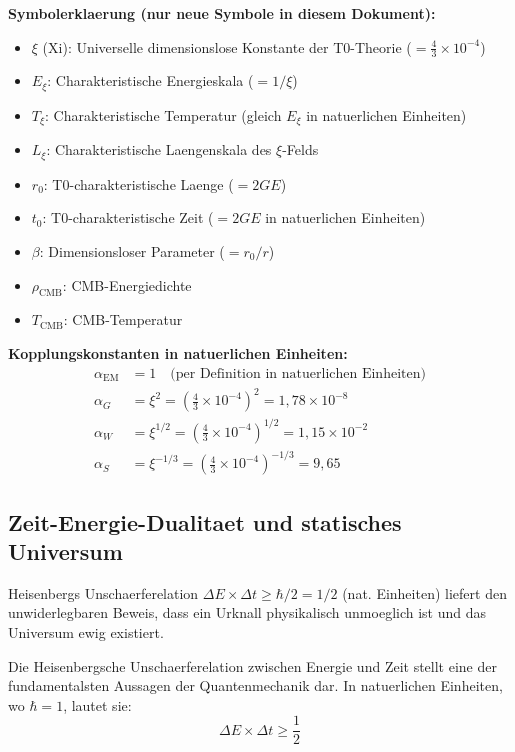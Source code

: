 \documentclass[12pt,a4paper]{article}
\begin{document}
	\textbf{Symbolerklaerung (nur neue Symbole in diesem Dokument):}
	\begin{itemize}
		\item $\xi$ (Xi): Universelle dimensionslose Konstante der T0-Theorie ($= \frac{4}{3} \times 10^{-4}$)
		\item $E_\xi$: Charakteristische Energieskala ($= 1/\xi$)
		\item $T_\xi$: Charakteristische Temperatur (gleich $E_\xi$ in natuerlichen Einheiten)
		\item $L_\xi$: Charakteristische Laengenskala des $\xi$-Felds
		\item $r_0$: T0-charakteristische Laenge ($= 2GE$)
		\item $t_0$: T0-charakteristische Zeit ($= 2GE$ in natuerlichen Einheiten)
		\item $\beta$: Dimensionsloser Parameter ($= r_0/r$)
		\item $\rho_{\text{CMB}}$: CMB-Energiedichte
		\item $T_{\text{CMB}}$: CMB-Temperatur
	\end{itemize}
	
	\textbf{Kopplungskonstanten in natuerlichen Einheiten:}
	\begin{align}
		\alpha_{\text{EM}} &= 1 \quad \text{(per Definition in natuerlichen Einheiten)} \\
		\alpha_G &= \xi^2 = \left(\frac{4}{3} \times 10^{-4}\right)^2 = 1{,}78 \times 10^{-8} \\
		\alpha_W &= \xi^{1/2} = \left(\frac{4}{3} \times 10^{-4}\right)^{1/2} = 1{,}15 \times 10^{-2} \\
		\alpha_S &= \xi^{-1/3} = \left(\frac{4}{3} \times 10^{-4}\right)^{-1/3} = 9{,}65
	\end{align}
	
	\subsection{Zeit-Energie-Dualitaet und statisches Universum}
	
	\begin{important}
		Heisenbergs Unschaerferelation $\Delta E \times \Delta t \geq \hbar/2 = 1/2$ (nat. Einheiten) liefert den unwiderlegbaren Beweis, dass ein Urknall physikalisch unmoeglich ist und das Universum ewig existiert.
	\end{important}
	
	Die Heisenbergsche Unschaerferelation zwischen Energie und Zeit stellt eine der fundamentalsten Aussagen der Quantenmechanik dar. In natuerlichen Einheiten, wo $\hbar = 1$, lautet sie:
	\begin{equation}
		\Delta E \times \Delta t \geq \frac{1}{2}
	\end{equation}
	
\end{document}
